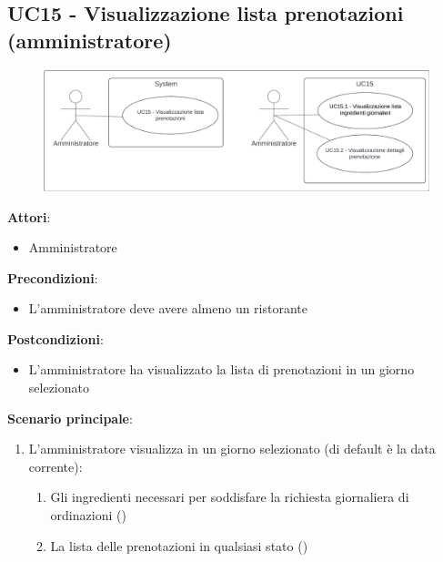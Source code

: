 \subsection{UC15 - Visualizzazione lista prenotazioni (amministratore)} \label{usecase:15}
\begin{figure}[H]
    \centering
    \includegraphics[width=0.9\linewidth]{ucd/ucd15.png}
\end{figure}
\textbf{Attori}:
\begin{itemize}
    \item Amministratore
\end{itemize}
\textbf{Precondizioni}:
\begin{itemize}
    \item L'amministratore deve avere almeno un ristorante
\end{itemize}
\textbf{Postcondizioni}:
\begin{itemize}
    \item L'amministratore ha visualizzato la lista di prenotazioni in un giorno selezionato
\end{itemize}
\textbf{Scenario principale}:
\begin{enumerate}
   \item L'amministratore visualizza in un giorno selezionato (di default è la data corrente):
   \begin{enumerate}
       \item Gli ingredienti necessari per soddisfare la richiesta giornaliera di ordinazioni ()
       \item La lista delle prenotazioni in qualsiasi stato
       ()
   \end{enumerate}
\end{enumerate}

